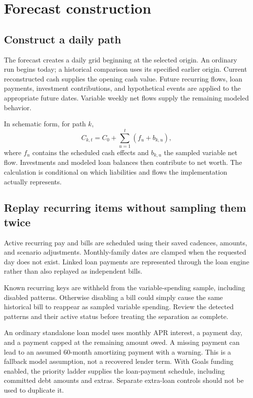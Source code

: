 \chapter{Forecast construction}\label{ch:forecast-methods}
\section{Construct a daily path}
The forecast creates a daily grid beginning at the selected origin. An ordinary run begins today; a historical comparison uses its specified earlier origin. Current reconstructed cash supplies the opening cash value. Future recurring flows, loan payments, investment contributions, and hypothetical events are applied to the appropriate future dates. Variable weekly net flows supply the remaining modeled behavior.

In schematic form, for path \(k\),
\[
 C_{k,t}=C_0+\sum_{u=1}^{t}\left(f_u+b_{k,u}\right),
\]
where \(f_u\) contains the scheduled cash effects and \(b_{k,u}\) the sampled variable net flow. Investments and modeled loan balances then contribute to net worth. The calculation is conditional on which liabilities and flows the implementation actually represents.



\section{Replay recurring items without sampling them twice}
Active recurring pay and bills are scheduled using their saved cadences, amounts, and scenario adjustments. Monthly-family dates are clamped when the requested day does not exist. Linked loan payments are represented through the loan engine rather than also replayed as independent bills.

Known recurring keys are withheld from the variable-spending sample, including disabled patterns. Otherwise disabling a bill could simply cause the same historical bill to reappear as sampled variable spending. Review the detected patterns and their active status before treating the separation as complete.

An ordinary standalone loan model uses monthly APR interest, a payment day, and a payment capped at the remaining amount owed. A missing payment can lead to an assumed 60-month amortizing payment with a warning. This is a fallback model assumption, not a recovered lender term. With Goals funding enabled, the priority ladder supplies the loan-payment schedule, including committed debt amounts and extras. Separate extra-loan controls should not be used to duplicate it.

